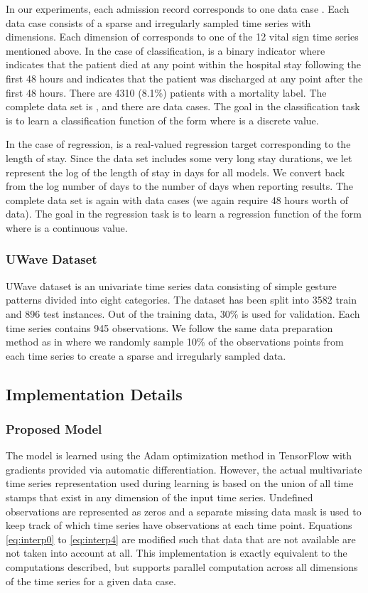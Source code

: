 \documentclass{article} \usepackage{iclr2019_conference,times}
\begin{document}
In our experiments, each admission record corresponds to one data case . Each data case  consists of a sparse and irregularly sampled time series  with  dimensions. Each dimension  
of  corresponds to one of the 12 vital sign time series mentioned above. In the case of classification,  is a binary indicator where  indicates that the patient died at any point within the hospital stay following the first 48 hours and  indicates that the patient was discharged at any point after the first 48 hours. There are 4310 (8.1\%) patients with a  mortality label. The complete data set is , and there
are  data cases. The goal in the classification task is to learn a classification function  of the
form  where  is a discrete value.

In the case of regression,  is a real-valued regression target corresponding to the length of stay. Since the
data set includes some very long stay durations, we let  represent the log of the length of stay in days for 
all models. We convert back from the log number of days to the number of days when reporting results.
The complete data set is again  with
 data cases (we again require 48 hours worth of data). The goal in the regression task is to learn a regression function  of the form  where  is a continuous value.

\subsubsection{UWave Dataset}
UWave dataset is an univariate time series data consisting of simple gesture patterns divided into eight categories. The dataset has been split into 3582  train and 896 test instances. Out of the training data, 30\% is used for validation. Each time series contains 945 observations. We follow the same data preparation method as in \cite{li2016scalable} where we randomly sample 10\% of the observations points from each time series to create a sparse and irregularly sampled data.

\subsection{Implementation Details}
\label{implementation}
\subsubsection{Proposed Model}
The model is learned using the Adam optimization method 
in TensorFlow with gradients provided via automatic differentiation.
However, the actual multivariate time series  
representation used during learning is based on the union
of all time stamps that exist in any dimension of the input time series.
Undefined observations are represented as zeros and a separate
missing data mask is used to keep track of which time series have
observations at each time point. Equations \ref{eq:interp0} to \ref{eq:interp4} are modified such
that data that are not available are not taken into account at all.
This implementation is exactly equivalent to the computations
described, but supports parallel computation
across all dimensions of the time series for a given data case.
\end{document}

